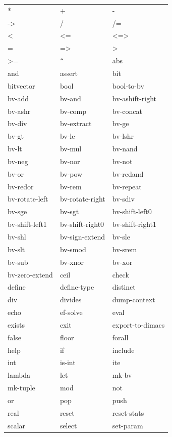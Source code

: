 \documentclass[11pt,twoside,fleqn,openright,titlepage]{cslreport}
\begin{document}
\begin{table}
\begin{small}
\begin{center}
\begin{tt}
\begin{tabular}{|p{3.4cm}|p{3.4cm}|p{4.7cm}|}
\hline
* & + & - \\
-> & / & /= \\
< & <= & <=> \\
 = & => & > \\
>= & \verb|^| & abs \\
and & assert & bit \\
bitvector & bool & bool-to-bv \\
bv-add & bv-and & bv-ashift-right\\
bv-ashr & bv-comp & bv-concat \\
bv-div  & bv-extract & bv-ge \\
bv-gt  & bv-le & bv-lshr \\
bv-lt  & bv-mul & bv-nand \\
bv-neg & bv-nor & bv-not\\
bv-or  & bv-pow & bv-redand \\
bv-redor & bv-rem & bv-repeat \\
bv-rotate-left & bv-rotate-right & bv-sdiv \\
bv-sge & bv-sgt & bv-shift-left0 \\
bv-shift-left1 & bv-shift-right0 & bv-shift-right1 \\
bv-shl & bv-sign-extend & bv-sle \\
bv-slt & bv-smod & bv-srem \\
bv-sub & bv-xnor & bv-xor \\
bv-zero-extend & ceil & check \\
define & define-type & distinct \\
div & divides & dump-context \\
echo  & ef-solve & eval \\
exists & exit & export-to-dimacs \\
false & floor & forall \\
help & if & include \\
int & is-int & ite \\
lambda & let & mk-bv \\
mk-tuple & mod & not \\
or & pop & push \\
real & reset & reset-stats \\
scalar & select & set-param \\

\end{tabular}
\end{tt}
\end{center}
\end{small}
\end{table}
\end{document}
